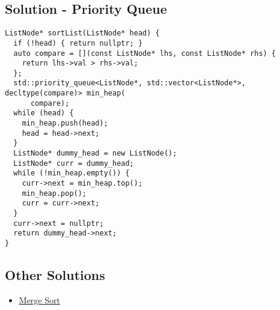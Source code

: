 \subsection*{Solution - Priority Queue}\label{solution:lc-148_priority_queue}
\begin{lstlisting}
ListNode* sortList(ListNode* head) {
  if (!head) { return nullptr; }
  auto compare = [](const ListNode* lhs, const ListNode* rhs) {
    return lhs->val > rhs->val;
  };
  std::priority_queue<ListNode*, std::vector<ListNode*>, decltype(compare)> min_heap(
      compare);
  while (head) {
    min_heap.push(head);
    head = head->next;
  }
  ListNode* dummy_head = new ListNode();
  ListNode* curr = dummy_head;
  while (!min_heap.empty()) {
    curr->next = min_heap.top();
    min_heap.pop();
    curr = curr->next;
  }
  curr->next = nullptr;
  return dummy_head->next;
}
\end{lstlisting}

\subsection*{Other Solutions}
\begin{itemize}
\item \hyperref[solution:lc0148_merge_sort]{Merge Sort}
\end{itemize}